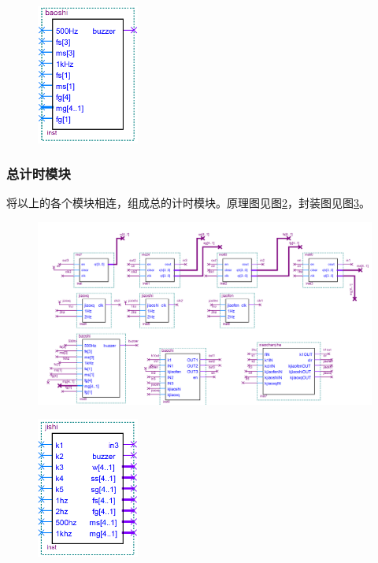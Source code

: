 \documentclass[12pt]{article}
\begin{document}
\begin{figure}[hp]
	\centering  
	\includegraphics[width=0.3\textwidth]{picture/fenzhuangbaoshi.png} 
	\caption{}
	\label{fig:fenzhuangbaoshi}   
\end{figure}\par
\subsubsection{总计时模块}
将以上的各个模块相连，组成总的计时模块。原理图见图\ref{fig:jishi}，封装图见图\ref{fig:fengzhuangjishi}。
\begin{figure}[hp]
	\centering  
	\includegraphics[width=\textwidth]{picture/jishi.png} 
	\caption{}
	\label{fig:jishi}   
\end{figure}
\begin{figure}[hp]
	\centering  
	\includegraphics[width=0.3\textwidth]{picture/fenzhuangjishi.png} 
	\caption{}
	\label{fig:fengzhuangjishi}   
\end{figure}\par
\end{document}
